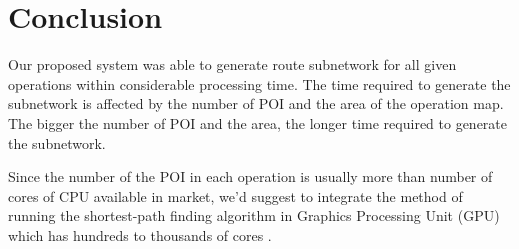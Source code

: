 \documentclass[conference]{IEEEtran}
\begin{document}
\section{Conclusion}

Our proposed system was able to generate route subnetwork for all given operations within considerable processing time. The time required to generate the subnetwork is affected by the number of POI and the area of the operation map. The bigger the number of POI and the area, the longer time required to generate the subnetwork.

Since the number of the POI in each operation is usually more than number of cores of CPU available in market, we'd suggest to integrate the method of running the shortest-path finding algorithm in Graphics Processing Unit (GPU) which has hundreds to thousands of cores \cite{harish2007accelerating}.




\end{document}
